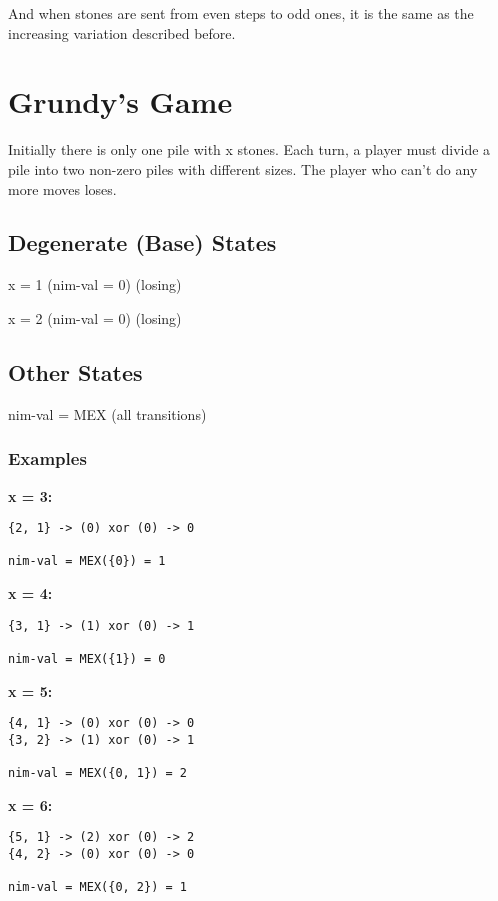 And when stones are sent from even steps to odd ones, it is the same as the increasing variation described before.

\section{Grundy's Game}

Initially there is only one pile with x stones.
Each turn, a player must divide a pile into two non-zero piles with different sizes.
The player who can't do any more moves loses.

\vspace{5pts}

\subsection{Degenerate (Base) States}

x = 1 (nim-val = 0) (losing)

x = 2 (nim-val = 0) (losing)

\subsection{Other States}

nim-val = MEX (all transitions)

\subsubsection{Examples}

\textbf{x = 3:}
\begin{lstlisting}
{2, 1} -> (0) xor (0) -> 0

nim-val = MEX({0}) = 1
\end{lstlisting}

\textbf{x = 4:}
\begin{lstlisting}
{3, 1} -> (1) xor (0) -> 1

nim-val = MEX({1}) = 0
\end{lstlisting}

\textbf{x = 5:}
\begin{lstlisting}
{4, 1} -> (0) xor (0) -> 0
{3, 2} -> (1) xor (0) -> 1

nim-val = MEX({0, 1}) = 2
\end{lstlisting}

\textbf{x = 6:}
\begin{lstlisting}
{5, 1} -> (2) xor (0) -> 2
{4, 2} -> (0) xor (0) -> 0
    
nim-val = MEX({0, 2}) = 1
\end{lstlisting}

